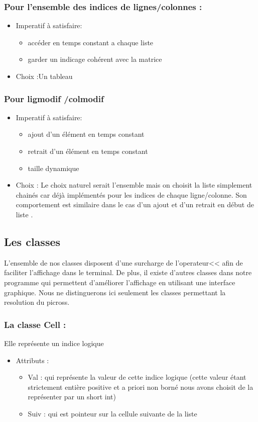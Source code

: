 \documentclass{article}
\begin{document}
\subsubsection{Pour l’ensemble des indices de lignes/colonnes :}
\begin{itemize}
\item Imperatif \`a satisfaire:
\begin{itemize}
\item acc\'eder en temps constant a chaque liste
\item garder un indicage coh\'erent avec la matrice
\end{itemize}
\item Choix :Un tableau
\end{itemize}
\subsubsection{Pour ligmodif /colmodif}
\begin{itemize}
\item Imperatif \`a satisfaire:
\begin{itemize}
\item ajout d’un \'el\'ement en temps constant
\item retrait d’un \'el\'ement en temps constant
\item taille dynamique
\end{itemize}
\item Choix :
Le choix naturel serait l’ensemble mais on choisit la liste simplement chain\'es car d\'ej\`a  impl\'ement\'es pour les indices de chaque ligne/colonne. Son
comportement est similaire dans le cas d'un ajout et d'un retrait en d\'ebut de liste .
\end{itemize}
\subsection{ Les classes}
L'ensemble de nos classes disposent d'une surcharge de l'operateur<< afin de faciliter l'affichage dans le terminal. De plus, il existe d'autres classes dans notre
programme qui permettent d'am\'eliorer l'affichage en utilisant une interface graphique. Nous ne distinguerons ici seulement les classes permettant la
resolution du picross.

\subsubsection{La classe Cell :}
Elle repr\'esente un indice logique
\begin{itemize}
\item Attributs :
\begin{itemize}
\item Val : qui repr\'esente la valeur de cette indice logique (cette valeur \'etant strictement enti\`ere positive et a priori non born\'e nous avons choisit de la repr\'esenter par un short int)
\item Suiv : qui est pointeur sur la cellule suivante de la liste
\end{itemize}
\end{itemize}
\end{document}
